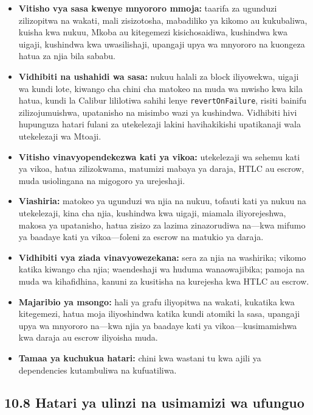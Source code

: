 \documentclass[11pt]{article}
\begin{document}
\begin{itemize}[leftmargin=*]
\item \textbf{Vitisho vya sasa kwenye mnyororo mmoja:} taarifa za ugunduzi zilizopitwa na wakati, mali zisizotosha, mabadiliko ya kikomo au kukubaliwa, kuisha kwa nukuu, Mkoba au kitegemezi kisichosaidiwa, kushindwa kwa uigaji, kushindwa kwa uwasilishaji, upangaji upya wa mnyororo na kuongeza hatua za njia bila sababu.
\item \textbf{Vidhibiti na ushahidi wa sasa:} nukuu halali za block iliyowekwa, uigaji wa kundi lote, kiwango cha chini cha matokeo na muda wa mwisho kwa kila hatua, kundi la Calibur lililotiwa sahihi lenye \texttt{revertOnFailure}, risiti bainifu zilizojumuishwa, upatanisho na misimbo wazi ya kushindwa. Vidhibiti hivi hupunguza hatari fulani za utekelezaji lakini havihakikishi upatikanaji wala utekelezaji wa Mtoaji.
\item \textbf{Vitisho vinavyopendekezwa kati ya vikoa:} utekelezaji wa sehemu kati ya vikoa, hatua zilizokwama, matumizi mabaya ya daraja, HTLC au escrow, muda usiolingana na migogoro ya urejeshaji.
\item \textbf{Viashiria:} matokeo ya ugunduzi wa njia na nukuu, tofauti kati ya nukuu na utekelezaji, kina cha njia, kushindwa kwa uigaji, miamala iliyorejeshwa, makosa ya upatanisho, hatua zisizo za lazima zinazorudiwa na---kwa mifumo ya baadaye kati ya vikoa---foleni za escrow na matukio ya daraja.
\item \textbf{Vidhibiti vya ziada vinavyowezekana:} sera za njia na washirika; vikomo katika kiwango cha njia; waendeshaji wa huduma wanaowajibika; pamoja na muda wa kihafidhina, kanuni za kusitisha na kurejesha kwa HTLC au escrow.
\item \textbf{Majaribio ya msongo:} hali ya grafu iliyopitwa na wakati, kukatika kwa kitegemezi, hatua moja iliyoshindwa katika kundi atomiki la sasa, upangaji upya wa mnyororo na---kwa njia ya baadaye kati ya vikoa---kusimamishwa kwa daraja au escrow iliyoisha muda.
\item \textbf{Tamaa ya kuchukua hatari:} chini kwa wastani tu kwa ajili ya dependencies kutambuliwa na kufuatiliwa.
\end{itemize}
\subsection*{10.8 Hatari ya ulinzi na usimamizi wa ufunguo}
\end{document}
